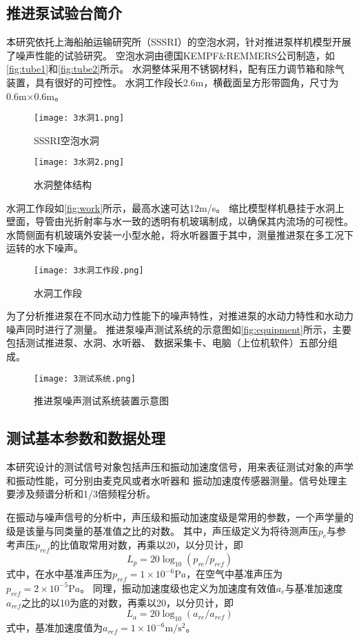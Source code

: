 \subsection{推进泵试验台简介}
本研究依托上海船舶运输研究所（SSSRI）的空泡水洞，针对推进泵样机模型开展了噪声性能的试验研究。
空泡水洞由德国KEMPF\&REMMERS公司制造，如\autoref{fig:tube1}和\autoref{fig:tube2}所示。
水洞整体采用不锈钢材料，配有压力调节箱和除气装置，具有很好的可控性。
水洞工作段长2.6m，横截面呈方形带圆角，尺寸为0.6m×0.6m。
\begin{figure}[htbp]
    \centering
    \texttt{[image: 3水洞1.png]}
    \caption{\label{fig:tube1}SSSRI空泡水洞}
\end{figure}
\begin{figure}[htbp]
    \centering
    \texttt{[image: 3水洞2.png]}
    \caption{\label{fig:tube2}水洞整体结构}
\end{figure}

水洞工作段如\autoref{fig:work}所示，最高水速可达12m/s。
缩比模型样机悬挂于水洞上壁面，导管由光折射率与水一致的透明有机玻璃制成，以确保其内流场的可视性。
水筒侧面有机玻璃外安装一小型水舱，将水听器置于其中，测量推进泵在多工况下运转的水下噪声。
\begin{figure}[htbp]
    \centering
    \texttt{[image: 3水洞工作段.png]}
    \caption{\label{fig:work}水洞工作段}
\end{figure}

为了分析推进泵在不同水动力性能下的噪声特性，对推进泵的水动力特性和水动力噪声同时进行了测量。
推进泵噪声测试系统的示意图如\autoref{fig:equipment}所示，主要包括测试推进泵、水洞、水听器、
数据采集卡、电脑（上位机软件）五部分组成。
\begin{figure}[htbp]
    \centering
    \texttt{[image: 3测试系统.png]}
    \caption{\label{fig:equipment}推进泵噪声测试系统装置示意图}
\end{figure}

\subsection{测试基本参数和数据处理}
本研究设计的测试信号对象包括声压和振动加速度信号，用来表征测试对象的声学和振动性能，可分别由麦克风或者水听器和
振动加速度传感器测量。信号处理主要涉及频谱分析和1/3倍频程分析。

在振动与噪声信号的分析中，声压级和振动加速度级是常用的参数，一个声学量的级是该量与同类量的基准值之比的对数。
其中，声压级定义为将待测声压$p_e$与参考声压$p_{ref}$的比值取常用对数，再乘以20，以分贝计，即
\begin{equation}
    \label{equ:p}
    L_{p} = 20\log_{10}{\left(p_{re}/p_{ref}\right )}
\end{equation}
式中，在水中基准声压为$p_{ref}= 1\times 10^{-6} \mathrm{P} a$，在空气中基准声压为$p_{ref}= 2\times 10^{-5} \mathrm{P} a$。
同理，振动加速度级也定义为加速度有效值$a_e$与基准加速度$a_{ref}$之比的以10为底的对数，再乘以20，以分贝计，即
\begin{equation}
    \label{equ:a}
    L_{a} = 20\log_{10}{\left(a_{re}/a_{ref}\right )}
\end{equation}
式中，基准加速度值为$a_{ref}= 1\times 10^{-6} \mathrm{m/s^2} $。

